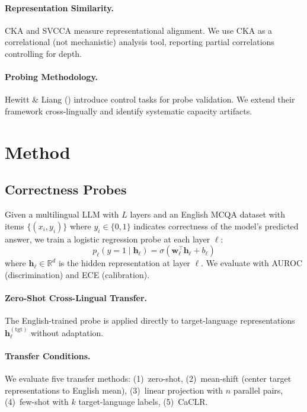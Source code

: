 \documentclass[11pt,a4paper]{article}
\begin{document}
\paragraph{Representation Similarity.}
CKA \cite{kornblith2019cka} and SVCCA \cite{raghu2017svcca} measure representational alignment.
We use CKA as a correlational (not mechanistic) analysis tool, reporting partial correlations controlling for depth.

\paragraph{Probing Methodology.}
Hewitt \& Liang (\citeyear{hewitt2019control}) introduce control tasks for probe validation.
We extend their framework cross-lingually and identify systematic capacity artifacts.

\section{Method}

\subsection{Correctness Probes}
\label{sec:probes}

Given a multilingual LLM with $L$ layers and an English MCQA dataset with items $\{(x_i, y_i)\}$ where $y_i \in \{0, 1\}$ indicates correctness of the model's predicted answer, we train a logistic regression probe at each layer $\ell$:
\begin{equation}
p_\ell(y=1 \mid \mathbf{h}_\ell) = \sigma(\mathbf{w}_\ell^\top \mathbf{h}_\ell + b_\ell)
\end{equation}
where $\mathbf{h}_\ell \in \mathbb{R}^d$ is the hidden representation at layer $\ell$.
We evaluate with AUROC (discrimination) and ECE (calibration).

\paragraph{Zero-Shot Cross-Lingual Transfer.}
The English-trained probe is applied directly to target-language representations $\mathbf{h}_\ell^{(\text{tgt})}$ without adaptation.

\paragraph{Transfer Conditions.}
We evaluate five transfer methods: (1)~zero-shot, (2)~mean-shift (center target representations to English mean), (3)~linear projection with $n$ parallel pairs, (4)~few-shot with $k$ target-language labels, (5)~CaCLR.
\end{document}
